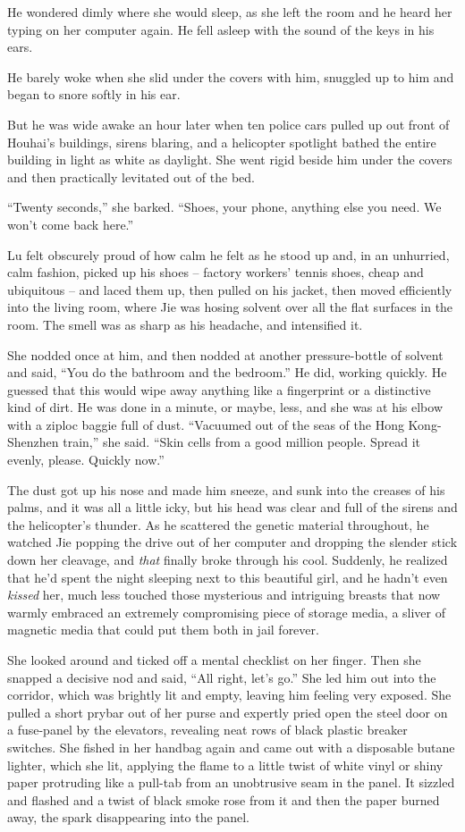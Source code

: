 He wondered dimly where she would sleep, as she left the room and
he heard her typing on her computer again. He fell asleep with the
sound of the keys in his ears.

He barely woke when she slid under the covers with him, snuggled up
to him and began to snore softly in his ear.

But he was wide awake an hour later when ten police cars pulled up
out front of Houhai's buildings, sirens blaring, and a helicopter
spotlight bathed the entire building in light as white as daylight.
She went rigid beside him under the covers and then practically
levitated out of the bed.

``Twenty seconds,'' she barked. ``Shoes, your phone, anything else you
need. We won't come back here.''

Lu felt obscurely proud of how calm he felt as he stood up and, in
an unhurried, calm fashion, picked up his shoes -- factory workers'
tennis shoes, cheap and ubiquitous -- and laced them up, then
pulled on his jacket, then moved efficiently into the living room,
where Jie was hosing solvent over all the flat surfaces in the
room. The smell was as sharp as his headache, and intensified it.

She nodded once at him, and then nodded at another pressure-bottle
of solvent and said, ``You do the bathroom and the bedroom.'' He did,
working quickly. He guessed that this would wipe away anything like
a fingerprint or a distinctive kind of dirt. He was done in a
minute, or maybe, less, and she was at his elbow with a ziploc
baggie full of dust. ``Vacuumed out of the seas of the Hong
Kong-Shenzhen train,'' she said. ``Skin cells from a good million
people. Spread it evenly, please. Quickly now.''

The dust got up his nose and made him sneeze, and sunk into the
creases of his palms, and it was all a little icky, but his head
was clear and full of the sirens and the helicopter's thunder. As
he scattered the genetic material throughout, he watched Jie
popping the drive out of her computer and dropping the slender
stick down her cleavage, and \emph{that} finally broke through his
cool. Suddenly, he realized that he'd spent the night sleeping next
to this beautiful girl, and he hadn't even \emph{kissed} her, much
less touched those mysterious and intriguing breasts that now
warmly embraced an extremely compromising piece of storage media, a
sliver of magnetic media that could put them both in jail forever.

She looked around and ticked off a mental checklist on her finger.
Then she snapped a decisive nod and said, ``All right, let's go.''
She led him out into the corridor, which was brightly lit and
empty, leaving him feeling very exposed. She pulled a short prybar
out of her purse and expertly pried open the steel door on a
fuse-panel by the elevators, revealing neat rows of black plastic
breaker switches. She fished in her handbag again and came out with
a disposable butane lighter, which she lit, applying the flame to a
little twist of white vinyl or shiny paper protruding like a
pull-tab from an unobtrusive seam in the panel. It sizzled and
flashed and a twist of black smoke rose from it and then the paper
burned away, the spark disappearing into the panel.

